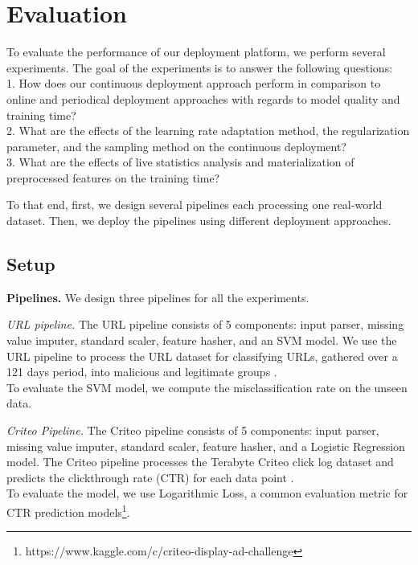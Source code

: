 \section{Evaluation} \label{evaluation} 
To evaluate the performance of our deployment platform, we perform several experiments.
The goal of the experiments is to answer the following questions:\\
1. How does our continuous deployment approach perform in comparison to online and periodical deployment approaches with regards to model quality and training time? \\
2. What are the effects of the learning rate adaptation method, the regularization parameter, and the sampling method on the continuous deployment? \\
3. What are the effects of live statistics analysis and materialization of preprocessed features on the training time?

To that end, first, we design several pipelines each processing one real-world dataset.
Then, we deploy the pipelines using different deployment approaches.

\subsection{Setup}\label{subsec:setup}
\textbf{Pipelines.}
We design three pipelines for all the experiments.

\textit{URL pipeline. } The URL pipeline consists of 5 components: input parser, missing value imputer, standard scaler, feature hasher, and an SVM model.
We use the URL pipeline to process the URL dataset for classifying URLs, gathered over a 121 days period, into malicious and legitimate groups \cite{ma2009identifying}.\\
To evaluate the SVM model, we compute the misclassification rate on the unseen data.

\textit{Criteo Pipeline.} 
The Criteo pipeline consists of 5 components: input parser, missing value imputer, standard scaler, feature hasher, and a Logistic Regression model.
The Criteo pipeline processes the Terabyte Criteo click log dataset and predicts the clickthrough rate (CTR) for each data point \cite{criteo-log}.\\
To evaluate the model, we use Logarithmic Loss, a common evaluation metric for CTR prediction models\footnote{https://www.kaggle.com/c/criteo-display-ad-challenge}.



